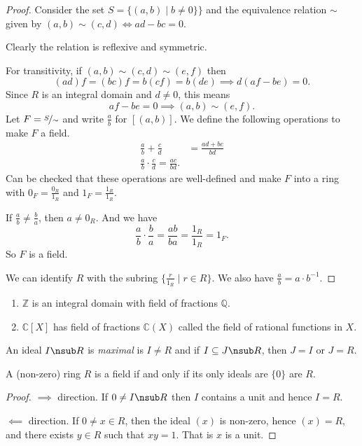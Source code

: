 \begin{proof}
    Consider the set \(S = \{(a,b)\mid b \neq 0\}\}\) and the equivalence relation \(\sim\) given by \((a,b) \sim (c,d) \iff ad - bc = 0\).

    Clearly the relation is reflexive and symmetric.
    
    For transitivity, if \((a,b)\sim (c,d)\sim (e,f)\) then
    \[
        (ad)f = (bc)f = b(cf) = b(de) \implies d(af-be) = 0.
    \]
    Since \(R\) is an integral domain and \(d\neq 0\), this means
    \[af - be = 0 \implies (a,b) \sim (e,f).\]
    Let \(F = \nicefrac{S}{\sim}\) and write \(\frac{a}{b}\) for \([(a,b)]\). We define the following operations to make \(F\) a field.
    \begin{align*}
        \frac{a}{b} + \frac{c}{d} &= \frac{ad + bc}{bd}\\
        \frac{a}{b}\cdot \frac{c}{d} = \frac{ac}{bd}.
    \end{align*}
    Can be checked that these operations are well-defined and make \(F\) into a ring with \(0_F = \frac{0_R}{1_R}\) and \(1_F = \frac{1_R}{1_R}\).

    If \(\frac{a}{b} \neq \frac{b}{a}\), then \(a \neq 0_R\). And we have
    \[
        \frac{a}{b}\cdot \frac{b}{a} = \frac{ab}{ba}=\frac{1_R}{1_R} = 1_F.
    \]
    So \(F\) is a field.

    We can identify \(R\) with the subring \(\{\frac{r}{1_R}\mid r \in R\}\). We also have \(\frac{a}{b} = a\cdot b^{-1}\).
\end{proof}
\begin{example}
    \leavevmode
    \begin{enumerate}
        \item \(\mathbb{Z}\) is an integral domain with field of fractions \(\mathbb{Q}\).
        \item \(\mathbb{C}[X]\) has field of fractions \(\mathbb{C}(X)\) called the field of rational functions in \(X\).
    \end{enumerate}
\end{example}
\begin{definition}
    An ideal \(I \nsub R\) is \textit{maximal} is \(I \neq R\) and if \(I \subseteq J \nsub R\), then \(J = I\) or \(J = R\).
\end{definition}
\begin{lemma}
    A (non-zero) ring \(R\) is a field if and only if its only ideals are \(\{0\}\) are \(R\).
\end{lemma}
\begin{proof}
    \(\implies\) direction. If \(0 \neq I \nsub R \) then \(I\) contains a unit and hence \(I = R\).

    \(\impliedby\) direction. If \( 0 \neq  x\in R\), then the ideal \((x)\) is non-zero, hence \((x) = R\), and there exists \(y \in R\) such that \(xy = 1\). That is \(x\) is a unit.
\end{proof}
